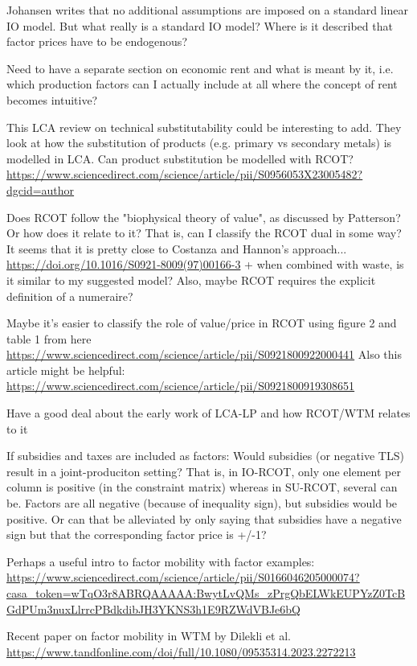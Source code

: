 Johansen writes that no additional assumptions are imposed on a standard linear IO model. But what really is a standard IO model? Where is it described that factor prices have to be endogenous?

Need to have a separate section on economic rent and what is meant by it, i.e. which production factors can I actually include at all where the concept of rent becomes intuitive?

This LCA review on technical substitutability could be interesting to add. They look at how the substitution of products (e.g. primary vs secondary metals) is modelled in LCA. Can product substitution be modelled with RCOT? \url{https://www.sciencedirect.com/science/article/pii/S0956053X23005482?dgcid=author}

Does RCOT follow the "biophysical theory of  value", as discussed by Patterson? Or how does it relate to it? That is, can I classify the RCOT dual in some way? It seems that it is pretty close to Costanza and Hannon's approach... \url{https://doi.org/10.1016/S0921-8009(97)00166-3} + when combined with waste, is it similar to my suggested model? Also, maybe RCOT requires the explicit definition of a numeraire?

Maybe it's easier to classify the role of value/price in RCOT using figure 2 and table 1 from here \url{https://www.sciencedirect.com/science/article/pii/S0921800922000441} Also this article might be helpful: \url{https://www.sciencedirect.com/science/article/pii/S0921800919308651}

Have a good deal about the early work of LCA-LP and how RCOT/WTM relates to it

If subsidies and taxes are included as factors: Would subsidies (or negative TLS) result in a joint-produciton setting? That is, in IO-RCOT, only one element per column is positive (in the constraint matrix) whereas in SU-RCOT, several can be. Factors are all negative (because of inequality sign), but subsidies would be positive. Or can that be alleviated by only saying that subsidies have a negative sign but that the corresponding factor price is +/-1?

Perhaps a useful intro to factor mobility with factor examples: \url{https://www.sciencedirect.com/science/article/pii/S0166046205000074?casa_token=wTqO3r8ABRQAAAAA:BwytLvQMs_zPrgQbELWkEUPYzZ0TcBGdPUm3nuxLlrrcPBdkdibJH3YKNS3h1E9RZWdVBJe6bQ}

Recent paper on factor mobility in WTM by Dilekli et al. \url{https://www.tandfonline.com/doi/full/10.1080/09535314.2023.2272213}